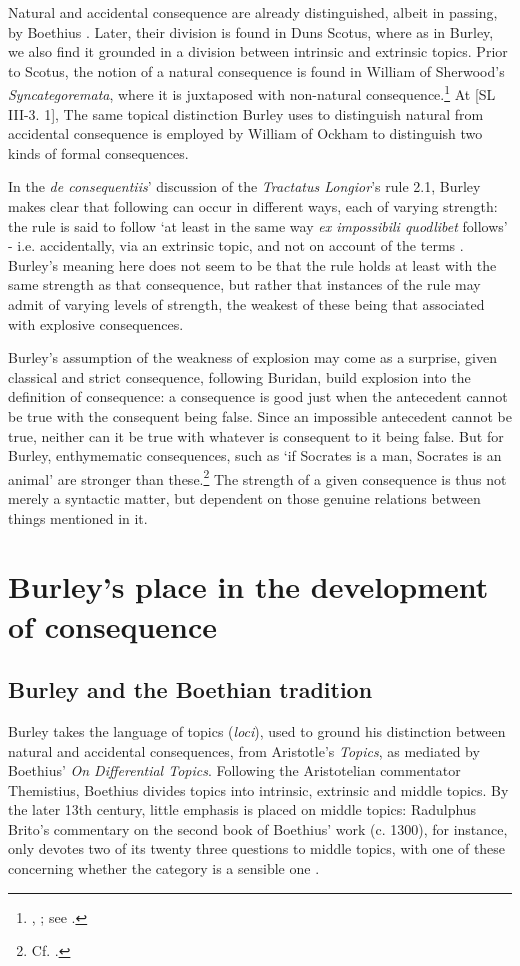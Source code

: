 \documentclass[]{article}
\begin{document}
Natural and accidental consequence are already distinguished, albeit in passing, by Boethius \cite[1.3.6]{BHS}. Later, their division is found in Duns Scotus, where as in Burley, we also find it grounded in a division between intrinsic and extrinsic topics. Prior to Scotus, the notion of a natural consequence is found in William of Sherwood's \textit{Syncategoremata}, where it is juxtaposed with non-natural consequence.\footnote{\cite[I, d. 11, q. 2, p. 136-137]{ScotusLectura}, \cite[p. 80]{Sherwood1941}; see \cite{Martin2012}.} At [SL III-3. 1], The same topical distinction Burley uses to distinguish natural from accidental consequence is employed by William of Ockham to distinguish two kinds of formal consequences.

In the \textit{de consequentiis}' discussion of the \textit{Tractatus Longior}'s rule 2.1, Burley makes clear that following can occur in different ways, each of varying strength: the rule is said to follow `at least in the same way \textit{ex impossibili quodlibet} follows' - i.e. accidentally, via an extrinsic topic, and not on account of the terms \cite[p. 132, par. 85]{Green-Pedersen1980b}. Burley's meaning here does not seem to be that the rule holds at least with the same strength as that consequence, but rather that instances of the rule may admit of varying levels of strength, the weakest of these being that associated with explosive consequences.

Burley's assumption of the weakness of explosion may come as a surprise, given classical and strict consequence, following Buridan, build explosion into the definition of consequence: a consequence is good just when the antecedent cannot be true with the consequent being false. Since an impossible antecedent cannot be true, neither can it be true with whatever is consequent to it being false. But for Burley, enthymematic consequences, such as `if Socrates is a man, Socrates is an animal' are stronger than these.\footnote{Cf. \cite[pp. 11-14]{Klima2016}.} The strength of a given consequence is thus not merely a syntactic matter, but dependent on those genuine relations between things mentioned in it. 
\section{Burley's place in the development of consequence}
\subsection{Burley and the Boethian tradition}
Burley takes the language of topics (\textit{loci}), used to ground his distinction between natural and accidental consequences, from Aristotle's \textit{Topics}, as mediated by Boethius' \textit{On Differential Topics}. Following the Aristotelian commentator Themistius, Boethius divides topics into intrinsic, extrinsic and middle topics. By the later 13th century, little emphasis is placed on middle topics: Radulphus Brito's commentary on the second book of Boethius' work (c. 1300), for instance, only devotes two of its twenty three questions to middle topics, with one of these concerning whether the category is a sensible one \cite{BritoDDT}.
\end{document}
